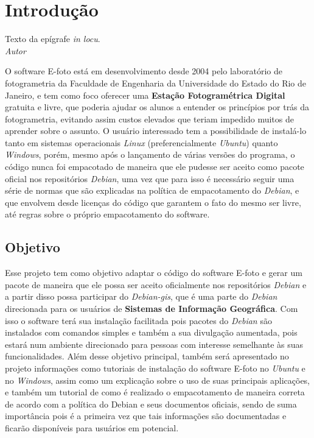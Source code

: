 \chapter*{Introdução}

\begin{epigrafeonline}
\hfill Texto da epígrafe \textit{in locu}.\\
\hspace*{\fill}\textit{Autor}\\
\end{epigrafeonline}

O software E-foto está em desenvolvimento desde 2004 pelo laboratório de fotogrametria da Faculdade de Engenharia da Universidade do Estado do Rio de Janeiro, e tem como foco oferecer uma \textbf{Estação Fotogramétrica Digital} gratuita e livre, que poderia ajudar os alunos a entender os princípios por trás da fotogrametria, evitando assim custos elevados que teriam impedido muitos de aprender sobre o assunto. O usuário interessado tem a possibilidade de instalá-lo tanto em sistemas operacionais \textit{Linux} (preferencialmente \textit{Ubuntu}) quanto \textit{Windows}, porém, mesmo após o lançamento de várias versões do programa, o código nunca foi empacotado de maneira que ele pudesse ser aceito como pacote oficial nos repositórios \textit{Debian}, uma vez que para isso é necessário seguir uma série de normas que são explicadas na política de empacotamento do \textit{Debian}, e que envolvem desde licenças do código que garantem o fato do mesmo ser livre, até regras sobre o próprio empacotamento do software.

\section*{Objetivo}

Esse projeto tem como objetivo adaptar o código do software E-foto e gerar um pacote  de maneira que ele possa ser aceito oficialmente nos repositórios \textit{Debian} e a partir disso possa participar do \textit{Debian-gis}, que é uma parte do \textit{Debian} direcionada para os usuários de \textbf{Sistemas de Informação Geográfica}. Com isso o software terá sua instalação facilitada pois pacotes do \textit{Debian} são instalados com comandos simples e também a sua divulgação aumentada, pois estará num ambiente direcionado para pessoas com interesse semelhante às suas funcionalidades. Além desse objetivo principal, também será apresentado no projeto informações como tutoriais de instalação do software E-foto no \textit{Ubuntu} e no \textit{Windows}, assim como um explicação sobre o uso de suas principais aplicações, e também um tutorial de como é realizado o empacotamento de maneira correta de acordo com a política do Debian e seus documentos oficiais, sendo de suma importância pois é a primeira vez que tais informações são documentadas e ficarão disponíveis para usuários em potencial.

